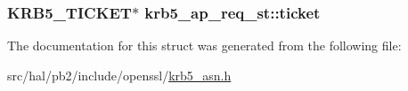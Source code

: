 \subsubsection[{\texorpdfstring{ticket}{ticket}}]{\setlength{\rightskip}{0pt plus 5cm}K\+R\+B5\+\_\+\+T\+I\+C\+K\+ET$\ast$ krb5\+\_\+ap\+\_\+req\+\_\+st\+::ticket}\hypertarget{structkrb5__ap__req__st_a9f842653f3c353af99fdd723151d26a4}{}\label{structkrb5__ap__req__st_a9f842653f3c353af99fdd723151d26a4}


The documentation for this struct was generated from the following file\+:\begin{DoxyCompactItemize}
\item 
src/hal/pb2/include/openssl/\hyperlink{krb5__asn_8h}{krb5\+\_\+asn.\+h}\end{DoxyCompactItemize}
